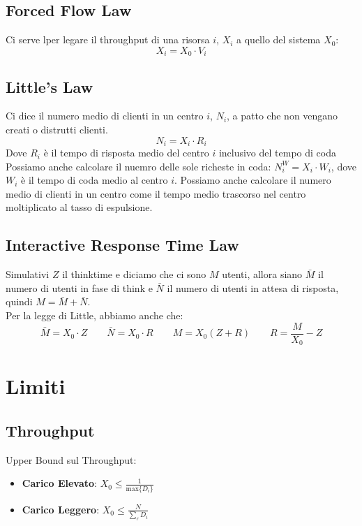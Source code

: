 \documentclass[11pt,a4paper]{article}
\begin{document}
    \subsection{Forced Flow Law}
    Ci serve lper legare il throughput di una risorsa $i$, $X_i$ a quello del sistema $X_0$:
    \begin{equation}
        X_i = X_0 \cdot V_i
    \end{equation}
    
    \subsection{Little's Law}
    Ci dice il numero medio di clienti in un centro $i$, $N_i$, a patto che non vengano creati o distrutti clienti.
    \begin{equation}
        N_i = X_i\cdot R_i
    \end{equation}
    Dove $R_i$ è il tempo di risposta medio del centro $i$ inclusivo del tempo di coda\\
    Possiamo anche calcolare il nuemro delle sole richeste in coda: $N_i^W = X_i\cdot W_i$, dove $W_i$ è il tempo di coda medio al centro $i$.
    Possiamo anche calcolare il numero medio di clienti in un centro come il tempo medio trascorso nel centro moltiplicato al tasso di espulsione.

    \subsection{Interactive Response Time Law}
    Simulativi $Z$ il thinktime e diciamo che ci sono $M$ utenti, allora siano $\bar{M}$ il numero di utenti in fase di think e $\bar{N}$ il numero di utenti in attesa di risposta, quindi $M = \bar{M} + \bar{N}$.\\
    Per la legge di Little, abbiamo anche che:
    \begin{equation}
    \bar{M} = X_0\cdot Z\qquad \bar{N} = X_0\cdot R\qquad M = X_0(Z+R)\qquad R = \frac{M}{X_0} - Z
    \end{equation}

    \section{Limiti}
    
    \subsection{Throughput}
    Upper Bound sul Throughput:
    \begin{itemize}
        \item \textbf{Carico Elevato}: $X_0 \le \frac{1}{\text{max}\{D_i\}}$
        \item \textbf{Carico Leggero}: $X_0 \le \frac{N}{\sum_r{D_i}}$
    \end{itemize}
\end{document}
